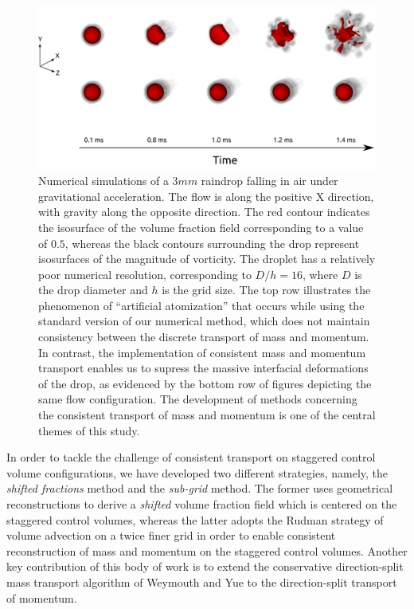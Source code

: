 \begin{figure}[h!]
\begin{center}
\includegraphics{plots/raindrop/raindrop_explode.png}
\end{center}
\caption{Numerical simulations of a $3 mm$ raindrop falling in air under gravitational acceleration.
	The flow is along the positive X direction, with gravity along the opposite direction. 
	The red contour indicates the isosurface of the volume fraction 
	field corresponding to a value of $0.5$, whereas the black contours 
	surrounding the drop represent isosurfaces of the magnitude of vorticity.
	The droplet has a relatively poor numerical resolution, corresponding to $D/h = 16$,
	where $D$ is the drop diameter and $h$ is the grid size.
	The top row illustrates the phenomenon of ``artificial atomization'' that occurs
	while using the standard version of our numerical method, which does not maintain
	consistency between the discrete transport of mass and momentum.
	In contrast, the implementation of consistent mass and momentum transport
	enables us to supress the massive interfacial deformations of the drop, 
	as evidenced by the bottom row of figures depicting the same flow configuration. 
	The development of methods concerning the consistent transport of mass and momentum 
	is one of the central themes of this study.
	}
	\label{explode_compare}
\end{figure}

In order to tackle the challenge of consistent transport on staggered control 
volume configurations, we have developed two different strategies, namely, 
the \textit{shifted fractions} method and the \textit{sub-grid} method. 
The former uses geometrical reconstructions to derive a 
\textit{shifted} volume fraction field which is centered on the staggered
control volumes, whereas the latter adopts the Rudman \cite{rudman1998volume} 
strategy of volume advection on a twice finer grid in order to 
enable consistent reconstruction of mass and momentum on the staggered control volumes. 
Another key contribution of this body of work is to extend the conservative 
direction-split mass transport algorithm of Weymouth and Yue  
to the direction-split transport of momentum.

